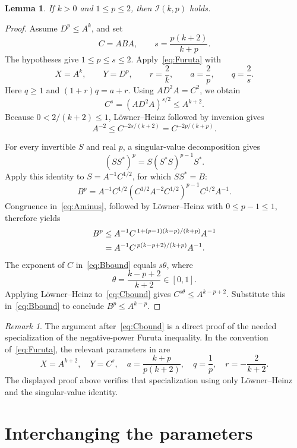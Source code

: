 \documentclass[11pt,a4paper]{article}
\newtheorem{lemma}[theorem]{Lemma}
\theoremstyle{remark}
\newtheorem{remark}[theorem]{Remark}
\begin{document}
\begin{lemma}\label{lem:large}
If \(k>0\) and \(1\le p\le2\), then \(\mathcal I(k,p)\) holds.
\end{lemma}

\begin{proof}
Assume \(D^p\le A^k\), and set
\[
 C=ABA,\qquad s=\frac{p(k+2)}{k+p}.
\]
The hypotheses give \(1\le p\le s\le2\).
Apply~\eqref{eq:Furuta} with
\[
 X=A^k,\qquad Y=D^p,\qquad r=\frac2k,\qquad
 a=\frac2p,\qquad q=\frac2s.
\]
Here \(q\ge1\) and \((1+r)q=a+r\). Using \(AD^2A=C^2\), we obtain
\begin{equation}\label{eq:Cbound}
 C^s=(AD^2A)^{s/2}\le A^{k+2}.
\end{equation}
Because \(0<2/(k+2)\le1\), L\"owner--Heinz followed by inversion
gives
\begin{equation}\label{eq:Aminus}
 A^{-2}\le C^{-2s/(k+2)}=C^{-2p/(k+p)}.
\end{equation}

For every invertible \(S\) and real \(p\), a singular-value
decomposition gives
\[
 (SS^*)^p=S(S^*S)^{p-1}S^*.
\]
Apply this identity to \(S=A^{-1}C^{1/2}\), for which \(SS^*=B\):
\[
 B^p=A^{-1}C^{1/2}
       (C^{1/2}A^{-2}C^{1/2})^{p-1}
       C^{1/2}A^{-1}.
\]
Congruence in~\eqref{eq:Aminus}, followed by
L\"owner--Heinz with \(0\le p-1\le1\), therefore yields
\begin{align}
 B^p
 &\le A^{-1}C^{\,1+(p-1)(k-p)/(k+p)}A^{-1}\notag\\
 &=A^{-1}C^{\,p(k-p+2)/(k+p)}A^{-1}.
 \label{eq:Bbound}
\end{align}
The exponent of \(C\) in~\eqref{eq:Bbound} equals \(s\theta\), where
\[
 \theta=\frac{k-p+2}{k+2}\in[0,1].
\]
Applying L\"owner--Heinz to~\eqref{eq:Cbound} gives
\(C^{s\theta}\le A^{k-p+2}\). Substitute this in~\eqref{eq:Bbound}
to conclude \(B^p\le A^{k-p}\).
\end{proof}

\begin{remark}
The argument after~\eqref{eq:Cbound} is a direct proof of the
needed specialization of the negative-power Furuta inequality.
In the convention of~\eqref{eq:Furuta}, the relevant parameters in
\cite[Theorem~3]{Tanahashi99} are
\[
 X=A^{k+2},\quad Y=C^s,\quad
 a=\frac{k+p}{p(k+2)},\quad q=\frac1p,\quad r=-\frac2{k+2}.
\]
The displayed proof above verifies that specialization using
only L\"owner--Heinz and the singular-value identity.
\end{remark}

\section{Interchanging the parameters}
\end{document}
